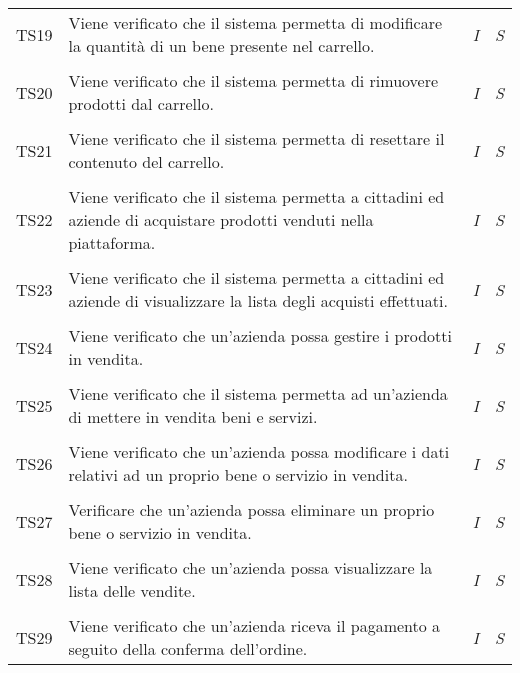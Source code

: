 \begin{longtable}{ >{\centering}p{} >{}p{}
			>{\centering}p{} >{\centering}p{}}
		\tabularnewline
		\hypertarget{TS19}{TS19} & Viene verificato che il sistema permetta di 
		modificare la quantità di un bene presente nel carrello. & 
		\textit{I} & \textit{S}\\ 

		\tabularnewline
		\hypertarget{TS20}{TS20} & Viene verificato che il sistema permetta di 
		rimuovere prodotti dal carrello. & \textit{I} & \textit{S}\\ 

		\tabularnewline
		\hypertarget{TS21}{TS21} & Viene verificato che il sistema permetta di 
		resettare il contenuto del carrello. & \textit{I} & \textit{S}\\ 

		\tabularnewline
		\hypertarget{TS22}{TS22} & Viene verificato che il sistema permetta 
		a 
		cittadini ed aziende di acquistare prodotti venduti nella piattaforma. & 
		\textit{I} & \textit{S}\\ 

		\tabularnewline
		\hypertarget{TS23}{TS23} & Viene verificato che il sistema permetta a 
		cittadini ed aziende di visualizzare la lista degli acquisti effettuati. & 
		\textit{I} & \textit{S}\\ 

		\tabularnewline
		\hypertarget{TS24}{TS24} & Viene verificato che un'azienda possa gestire i 
		prodotti in vendita. & \textit{I} & \textit{S}\\ 

		\tabularnewline
		\hypertarget{TS25}{TS25} & Viene verificato che il sistema permetta ad 
		un'azienda di mettere in vendita beni e servizi. & \textit{I} & \textit{S}\\ 

		\tabularnewline
		\hypertarget{TS26}{TS26} & Viene verificato che un'azienda possa 
		modificare i dati relativi ad un proprio bene o servizio in vendita. & 
		\textit{I} & \textit{S}\\ 

		\tabularnewline
		\hypertarget{TS27}{TS27} & Verificare che un'azienda possa eliminare un 
		proprio bene o servizio in vendita. & \textit{I} & \textit{S}\\ 

		\tabularnewline
		\hypertarget{TS28}{TS28} & Viene verificato che un'azienda possa 
		visualizzare la lista delle vendite. & \textit{I} & \textit{S}\\ 

		\tabularnewline
		\hypertarget{TS29}{TS29} & Viene verificato che un'azienda riceva il 
		pagamento a seguito della conferma dell'ordine. & \textit{I} & \textit{S}\\ 


\end{longtable}
